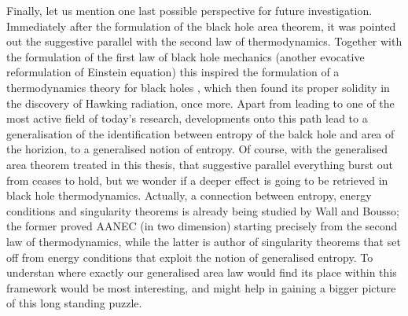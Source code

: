 Finally, let us mention one last possible perspective for future investigation. Immediately after the formulation of the black hole area theorem, it was pointed out the suggestive parallel with the second law of thermodynamics. Together with the formulation of the first law of black hole mechanics (another evocative reformulation of Einstein equation) this inspired the formulation of a thermodynamics theory for black holes \cite[]{bardeen1973four}, which then found its proper solidity in the discovery of Hawking radiation, once more.
Apart from leading to one of the most active field of today's research, developments onto this path lead to a generalisation of the identification between entropy of the balck hole and area of the horizion, to a generalised notion of entropy.
Of course, with the generalised area theorem treated in this thesis, that suggestive parallel everything burst out from ceases to hold, but we wonder if a deeper effect is going to be retrieved in black hole thermodynamics. 
Actually, a connection between entropy, energy conditions and singularity theorems is already being studied by Wall and Bousso; the former proved AANEC (in two dimension) starting precisely from the second law of thermodynamics, while the latter is author of singularity theorems that set off from energy conditions that exploit the notion of generalised entropy. To understan where exactly our generalised area law would find its place within this framework would be most interesting, and might help in gaining a bigger picture of this long standing puzzle.
